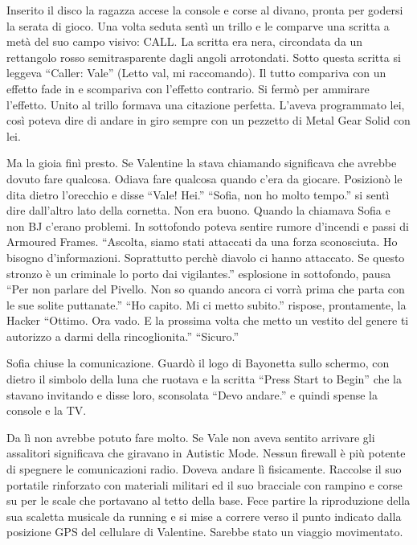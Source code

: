     Inserito il disco la ragazza accese la console e corse al divano,
    pronta per godersi la serata di gioco. Una volta seduta sentì un trillo
    e le comparve una scritta a metà del suo campo visivo: CALL. La scritta
    era nera, circondata da un rettangolo rosso semitrasparente dagli
    angoli arrotondati. Sotto questa scritta si leggeva ``Caller: Vale''
    (Letto val, mi raccomando). Il tutto compariva con un effetto fade in e
    scompariva con l'effetto contrario. Si fermò per ammirare l'effetto.
    Unito al trillo formava una citazione perfetta. L'aveva programmato
    lei, così poteva dire di andare in giro sempre con un pezzetto di Metal
    Gear Solid con lei.

    Ma la gioia finì presto. Se Valentine la stava chiamando significava
    che avrebbe dovuto fare qualcosa. Odiava fare qualcosa quando c'era da
    giocare. Posizionò le dita dietro l'orecchio e disse ``Vale! Hei.''
    ``Sofia, non ho molto tempo.'' si sentì dire dall'altro lato della
    cornetta. Non era buono. Quando la chiamava Sofia e non BJ c'erano problemi. In sottofondo poteva sentire rumore d'incendi e passi di
    Armoured Frames. ``Ascolta, siamo stati attaccati da una forza
    sconosciuta. Ho bisogno d'informazioni. Soprattutto perchè diavolo ci
    hanno attaccato. Se questo stronzo è un criminale lo porto dai
    vigilantes.'' esplosione in sottofondo, pausa ``Per non parlare del
    Pivello. Non so quando ancora ci vorrà prima che parta con le sue
    solite puttanate.'' ``Ho capito. Mi ci metto subito.'' rispose,
    prontamente, la Hacker ``Ottimo. Ora vado. E la prossima volta che
    metto un vestito del genere ti autorizzo a darmi della rincoglionita.''
    ``Sicuro.''

    Sofia chiuse la comunicazione. Guardò il logo di Bayonetta sullo
    schermo, con dietro il simbolo della luna che ruotava e la scritta
    ``Press Start to Begin'' che la stavano invitando e disse loro,
    sconsolata ``Devo andare.'' e quindi spense la console e la TV.

    Da lì non avrebbe potuto fare molto. Se Vale non aveva sentito arrivare
    gli assalitori significava che giravano in Autistic Mode. Nessun
    firewall è più potente di spegnere le comunicazioni radio. Doveva
    andare lì fisicamente. Raccolse il suo portatile rinforzato con
    materiali militari ed il suo bracciale con rampino e corse su per le
    scale che portavano al tetto della base. Fece partire la riproduzione
    della sua scaletta musicale da running e si mise a correre verso il
    punto indicato dalla posizione GPS del cellulare di Valentine. Sarebbe
    stato un viaggio movimentato.

